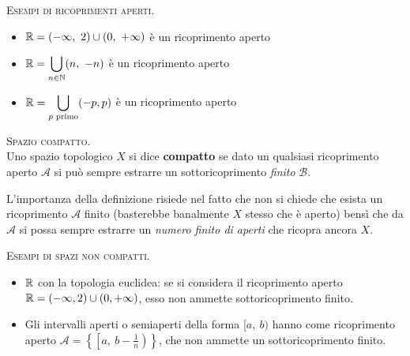 \begin{examples} \textsc{Esempi di ricoprimenti aperti.}
	\begin{itemize}
		\item $\displaystyle \realset=(-\infty ,\ 2)\cup(0,\ +\infty)$ è un ricoprimento aperto
		\item $\displaystyle \mathbb{R} =\mathop{{\bigcup}}\displaylimits_{n\in\mathbb{N}}(n,\ -n)$ è un ricoprimento aperto
		\item $\displaystyle \mathbb{R}=\mathop{{\bigcup}}\displaylimits_{p \text{ primo}}(-p,p)$ è un ricoprimento aperto
	\end{itemize}
\end{examples}

\begin{define} \textsc{Spazio compatto.}\\
	Uno spazio topologico $X$ si dice \textbf{compatto} se dato un qualsiasi ricoprimento aperto $\mathcal{A}$ si può sempre estrarre un sottoricoprimento \textit{finito} $\mathcal{B}$.
\end{define}
L'importanza della definizione risiede nel fatto che non si chiede che esista un ricoprimento $\mathcal{A}$ finito (basterebbe banalmente $X$ stesso che è aperto) bensì che da $\mathcal{A}$ si possa sempre estrarre un \textit{numero finito di aperti} che ricopra ancora $X$.

\begin{examples} \textsc{Esempi di spazi non compatti.}
	\begin{itemize}
		\item $\mathbb{R}$ con la topologia euclidea: se si considera il ricoprimento aperto $\displaystyle \mathbb{R}=(-\infty , 2)\cup(0,+\infty)$, esso non ammette sottoricoprimento finito.
		\item Gli intervalli aperti o semiaperti della forma $[a,\ b)$ hanno come ricoprimento aperto $\mathcal{A}=\left\{ \left[ a, \ b-\frac{1}{n}\right) \right\}$, che non ammette un sottoricoprimento finito.
	\end{itemize}
\end{examples}


